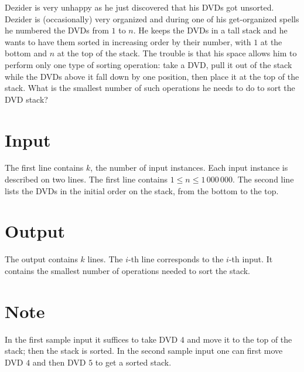 
Dezider is very unhappy as he just discovered that his DVDs got unsorted. Dezider is (occasionally) very organized and during one of his get-organized spells he numbered the DVDs from $1$ to $n$. He keeps the DVDs in a tall stack and he wants to have them sorted in increasing order  by their number, with $1$ at the bottom and $n$ at the top of the stack. The trouble is that his space allows him to perform only one type of sorting operation: take a DVD, pull it out of the stack while the DVDs above it fall down by one position, then place it at the top of the stack. What is the smallest number of such operations he needs to do to sort the DVD stack?

\section*{Input}
The first line contains $k$, the number of input instances. Each input instance is described on two
lines. The first line contains $1\le n\leq 1\,000\,000$. The second line lists the DVDs in the initial
order on the stack, from the bottom to the top.

\section*{Output}
The output contains $k$ lines. The $i$-th line corresponds to the $i$-th input.
It contains the smallest number of operations needed to sort the stack.

\section*{Note}
In the first sample input it suffices to take DVD $4$ and move it to the top of the stack; then the stack is sorted.
In the second sample input one can first move DVD $4$ and then DVD $5$ to get a sorted stack.
